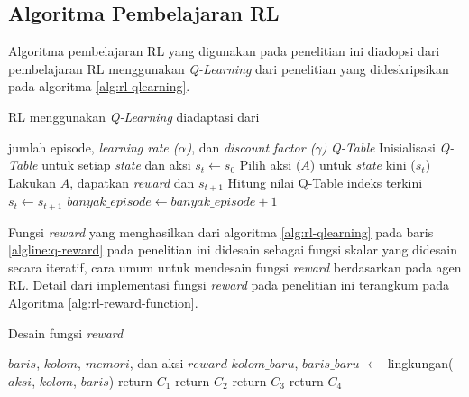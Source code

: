 \subsection{Algoritma Pembelajaran \acl{RL}}
\label{sec:sub-pembelajaran-rl}

Algoritma pembelajaran \ac{RL} yang digunakan pada penelitian ini diadopsi dari pembelajaran \ac{RL} menggunakan \textit{Q-Learning} dari penelitian \parencite{sutisna2023faraneq} yang dideskripsikan pada algoritma \ref{alg:rl-qlearning}.

\begin{algorithm}
	\makeatletter
	\renewcommand{\ALG@name}{Algoritma}
	\makeatother
	\caption{\ac{RL} menggunakan \textit{Q-Learning} diadaptasi dari \parencite{sutisna2023faraneq}}\label{alg:rl-qlearning}
	\renewcommand{\algorithmicrequire}{\textbf{Masukan:}}
	\renewcommand{\algorithmicensure}{\textbf{Keluaran:}}
	\begin{algorithmic}[1]
		\Require jumlah episode, \textit{learning rate ($\alpha$)}, dan \textit{discount factor ($\gamma$)}
		\Ensure \textit{Q-Table}
		\State Inisialisasi \textit{Q-Table} untuk setiap \textit{state} dan aksi
		\State $s_{t} \gets s_0$
		\State Pilih aksi ($A$) untuk \textit{state} kini ($s_t$)
		\State Lakukan $A$, dapatkan \textit{reward} dan $s_{t+1}$ \label{algline:q-reward}
		\State Hitung nilai Q-Table indeks terkini 
		\State $s_t \gets s_{t+1}$
		\EndWhile
		\State $banyak\_episode \gets banyak\_episode + 1$
		\EndWhile
	\end{algorithmic}
\end{algorithm}

Fungsi \textit{reward} yang menghasilkan dari algoritma \ref{alg:rl-qlearning} pada baris \ref{algline:q-reward} pada penelitian ini didesain sebagai fungsi skalar yang didesain secara iteratif, cara umum untuk mendesain fungsi \textit{reward} berdasarkan \parencite{hayes2022practical} pada agen \ac{RL}. Detail dari implementasi fungsi \textit{reward} pada penelitian ini terangkum pada Algoritma \ref{alg:rl-reward-function}.

\begin{algorithm}
	\makeatletter
	\renewcommand{\ALG@name}{Algoritma}
	\makeatother
	\caption{Desain fungsi \textit{reward}}\label{alg:rl-reward-function}
	\renewcommand{\algorithmicrequire}{\textbf{Masukan:}}
	\renewcommand{\algorithmicensure}{\textbf{Keluaran:}}
	\begin{algorithmic}[1]
		\Require $baris$, $kolom$, $memori$, dan aksi
		\Ensure $reward$
		\State $kolom\_baru$, $baris\_baru$ $\gets$ lingkungan($aksi$, $kolom$, $baris$)
		 \label{algline:reward-c1}
		\State return $C_1$
		\EndIf
		 \label{algline:reward-c2}
		\State return $C_2$
		\EndIf
		 \label{algline:reward-c3}
		\State return $C_3$
		\EndIf
		\State return $C_4$ \label{algline:reward-c4}
	\end{algorithmic}
\end{algorithm}

